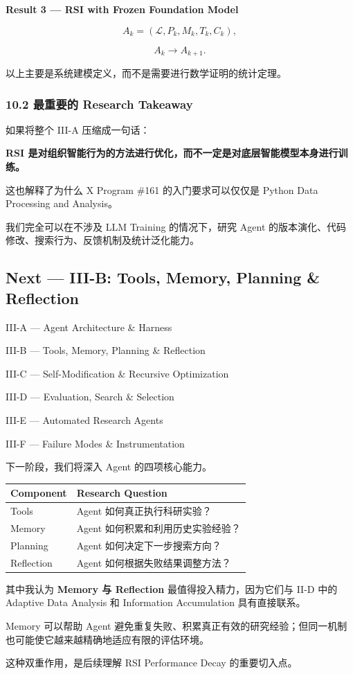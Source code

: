 \textbf{Result 3 --- RSI with Frozen Foundation Model}

\[A_k=(\mathcal L,P_k,M_k,T_k,C_k),\]

\[A_k\longrightarrow A_{k+1}.\]

以上主要是系统建模定义，而不是需要进行数学证明的统计定理。

\hypertarget{part-3-31-0001-ux6700ux91cdux8981ux7684-research-takeaway}{%
\subsubsection{10.2 最重要的 Research Takeaway}\label{part-3-31-0001-ux6700ux91cdux8981ux7684-research-takeaway}}

如果将整个 III-A 压缩成一句话：

\textbf{RSI 是对组织智能行为的方法进行优化，而不一定是对底层智能模型本身进行训练。}

这也解释了为什么 X Program \#161 的入门要求可以仅仅是 Python Data Processing and Analysis。

我们完全可以在不涉及 LLM Training 的情况下，研究 Agent 的版本演化、代码修改、搜索行为、反馈机制及统计泛化能力。

\hypertarget{part-3-31-0001-next-iii-b-tools-memory-planning-reflection}{%
\subsection{Next --- III-B: Tools, Memory, Planning \& Reflection}\label{part-3-31-0001-next-iii-b-tools-memory-planning-reflection}}

III-A --- Agent Architecture \& Harness

III-B --- Tools, Memory, Planning \& Reflection

III-C --- Self-Modification \& Recursive Optimization

III-D --- Evaluation, Search \& Selection

III-E --- Automated Research Agents

III-F --- Failure Modes \& Instrumentation

下一阶段，我们将深入 Agent 的四项核心能力。

\begin{readertable}
\begin{longtable}[]{@{}
  >{\raggedright\arraybackslash}p{}
  >{\raggedright\arraybackslash}p{}@{}}
\toprule
Component & Research Question \\
\midrule
\endhead
Tools & Agent 如何真正执行科研实验？ \\
Memory & Agent 如何积累和利用历史实验经验？ \\
Planning & Agent 如何决定下一步搜索方向？ \\
Reflection & Agent 如何根据失败结果调整方法？ \\
\bottomrule
\end{longtable}
\end{readertable}

其中我认为 \textbf{Memory 与 Reflection} 最值得投入精力，因为它们与 II-D 中的 Adaptive Data Analysis 和 Information Accumulation 具有直接联系。

Memory 可以帮助 Agent 避免重复失败、积累真正有效的研究经验；但同一机制也可能使它越来越精确地适应有限的评估环境。

这种双重作用，是后续理解 RSI Performance Decay 的重要切入点。
